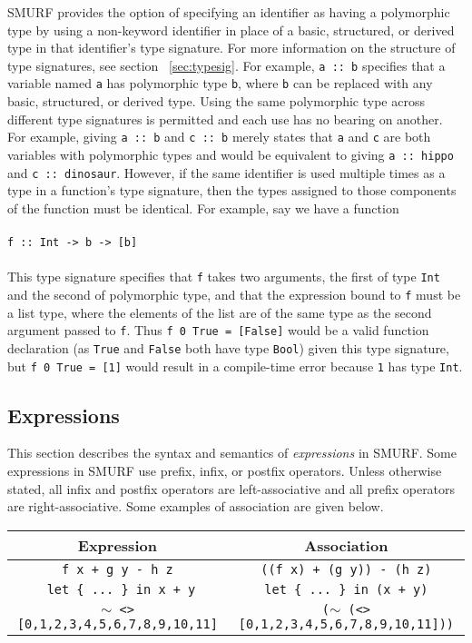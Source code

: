SMURF provides the option of specifying an identifier as having a polymorphic type by using a non-keyword identifier in place of a
basic, structured, or derived type in that identifier's type signature. For more information on the structure of type signatures,
see section ~\ref{sec:typesig}.
For example, \texttt{a :: b} specifies that a variable named \texttt{a} has polymorphic type \texttt{b}, where
\texttt{b} can be replaced with any basic, structured, or derived type. Using the same polymorphic type across different type signatures
is permitted and each use has no bearing on another. For example, giving \texttt{a :: b} and \texttt{c :: b} merely states that \texttt{a}
and \texttt{c} are both variables with polymorphic types and would be equivalent to giving \texttt{a :: hippo} and \texttt{c :: dinosaur}.
However, if the same identifier is used multiple times as a type in a function's type signature, then the types assigned to those components
of the function must be identical. For example, say we have a function \\\\ \texttt{f :: Int -> b -> [b]} \\\\ This type signature specifies that
\texttt{f} takes two arguments, the first of type \texttt{Int} and the second of polymorphic type, and that the expression bound to \texttt{f}
must be a list type, where the elements of the list are of the same type as the second argument passed to \texttt{f}. Thus
\texttt{f 0 True = [False]} would be a valid function declaration (as \texttt{True} and \texttt{False} both have type \texttt{Bool}) 
given this type signature, but \texttt{f 0 True = [1]} would result
in a compile-time error because \texttt{1} has type \texttt{Int}.


\subsection{Expressions}

This section describes the syntax and semantics of \emph{expressions} in 
SMURF. Some expressions in SMURF use prefix, infix, or postfix operators.
Unless otherwise stated, all infix and postfix operators are left-associative and
all prefix operators are right-associative. Some examples of association are given below.


\begin{center}
	\begin{tabular}{|c|c|}
		\hline
		Expression & Association \\
		\hline
		\texttt{f x + g y - h z} & \texttt{((f x) + (g y)) - (h z)} \\
		\texttt{ let \{ ... \} in x + y} & \texttt{let \{ ... \} in (x + y)} \\
		\texttt{$\sim$ <> [0,1,2,3,4,5,6,7,8,9,10,11]} &
					\texttt{($\sim$ (<> [0,1,2,3,4,5,6,7,8,9,10,11]))}\\
		\hline
	\end{tabular}
\end{center}

